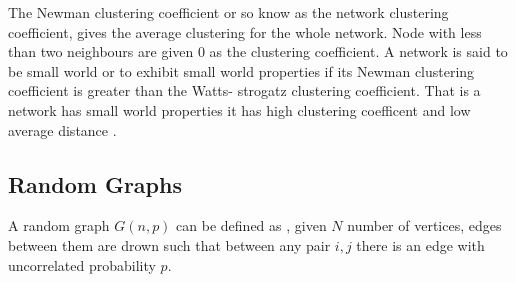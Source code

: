  The Newman clustering coefficient or so know as the network clustering coefficient, gives the average clustering for the whole network. Node with less than two neighbours are given 0 as the clustering coefficient.
 A network is said to be small world or to exhibit small world properties if its Newman clustering coefficient is greater than the Watts- strogatz clustering coefficient. That is a network has small world properties it has high clustering coefficent and low average distance \citep{estrada2012structure}.
 
\subsection{Random Graphs} 
 A random graph $G(n,p)$ can be defined as , given  $N$ number of vertices, edges between them are drown such that between any pair $i,j$ there is an edge with uncorrelated probability $p$. 


